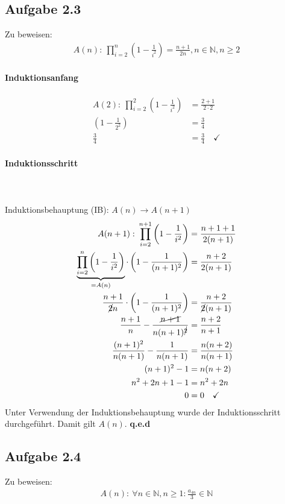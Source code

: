 \documentclass{article}
\begin{document}
    \subsection*{Aufgabe 2.3}
    Zu beweisen:
    \begin{align*}
        A(n): \: \prod_{i=2}^n \left(1-\frac{1}{i^2}\right) = \frac{n+1}{2n}, n\in \mathbb{N}, n \ge 2
    \end{align*}
    \paragraph*{Induktionsanfang} 
    \begin{align*}
        A(2): \: \prod_{i=2}^2 \left(1-\frac{1}{i^2}\right) &= \frac{2+1}{2\cdot 2} \\
        \left(1-\frac{1}{2^2}\right) &= \frac{3}{4} \\
        \frac{3}{4} &= \frac{3}{4} \quad \checkmark
    \end{align*}
    \paragraph*{Induktionsschritt} \hfill\\\\
    Induktionsbehauptung (IB): $A(n) \rightarrow A(n+1)$
    \begin{align*}
        A(n+1): \: \prod_{i=2}^{n+1} \left(1-\frac{1}{i^2}\right) &= \frac{n+1+1}{2(n+1)} \\
        \underbrace{\prod_{i=2}^{n} \left(1-\frac{1}{i^2}\right)}_{=A(n)}\cdot \left(1-\frac{1}{(n+1)^2}\right) &= \frac{n+2}{2(n+1)} \\
        \frac{n+1}{\cancel{2}n} \cdot \left(1-\frac{1}{(n+1)^2}\right) &= \frac{n+2}{\cancel{2}(n+1)} \\
        \frac{n+1}{n} -\frac{\cancel{n+1}}{n(n+1)^{\cancel{2}}} &= \frac{n+2}{n+1} \\
        \frac{(n+1)^2}{n(n+1)} - \frac{1}{n(n+1)} &= \frac{n(n+2)}{n(n+1)} \\
        (n+1)^2 - 1 &= n(n+2) \\
        n^2 + 2n + 1 -1 &= n^2 + 2n \\
        0 &= 0 \quad \checkmark
    \end{align*}
    Unter Verwendung der Induktionsbehauptung wurde der Induktionsschritt durchgeführt. Damit gilt $A(n)$. \textbf{q.e.d}


    \subsection*{Aufgabe 2.4}
    Zu beweisen:
    \begin{align*}
        A(n): \: \forall n\in \mathbb{N}, n \ge 1 :  \frac{a_{4n}}{3} \in \mathbb{N}
    \end{align*}
\end{document}
